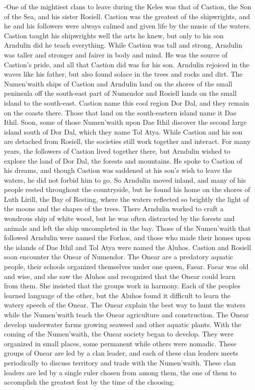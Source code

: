 \documentclass[smalldemyvopaper,11pt,twoside,onecolumn,openright,extrafontsizes]{memoir}
\begin{document}
{{-One of the mightiest clans to leave during the Keles was that of Castion, the Son of the Sea, and his sister Rosiell. Castion was the greatest of the shipwrights, and he and his followers were always calmed and given life by the music of the waters. Castion taught his shipwrights well the arts he knew, but only to his son Arndulin did he teach everything. While Castion was tall and strong, Arndulin was taller and stronger and fairer in body and mind. He was the source of Castion’s pride, and all that Castion did was for his son. Arndulin rejoiced in the waves like his father, but also found solace in the trees and rocks and dirt. The Numen’waith ships of Castion and Arndulin land on the shores of the small peninsula off the south-east part of Numendor and Rosiell lands on the small island to the south-east. Castion name this cool region Dor Dal, and they remain on the coasts there. Those that land on the south-eastern island name it Dae Ithil. Soon, some of those Numen’waith upon Dae Ithil discover the second large island south of Dor Dal, which they name Tol Atya. While Castion and his son are detached from Rosiell, the societies still work together and interact. For many years, the followers of Castion lived together there, but Arndulin wished to explore the land of Dor Dal, the forests and mountains. He spoke to Castion of his dreams, and though Castion was saddened at his son’s wish to leave the waters, he did not forbid him to go. So Arndulin moved inland, and many of his people rested throughout the countryside, but he found his home on the shores of Luth Lirill, the Bay of Resting, where the waters reflected so brightly the light of the moons and the shapes of the trees. There Arndulin worked to craft a wondrous ship of white wood, but he was often distracted by the forests and animals and left the ship uncompleted in the bay. Those of the Numen’waith that followed Arndulin were named the Forhos, and those who made their homes upon the islands of Dae Ithil and Tol Atya were named the Aluhos. Castion and Rosiell soon encounter the Onear of Numendor. The Onear are a predatory aquatic people, their schools organized themselves under one queen, Faear. Faear was old and wise, and she saw the Aluhos and recognized that the Onear could learn from them. She insisted that the groups work in harmony. Each of the peoples learned language of the other, but the Aluhos found it difficult to learn the watery speech of the Onear. The Onear explain the best way to hunt the waters while the Numen’waith teach the Onear agriculture and construction. The Onear develop underwater farms growing seaweed and other aquatic plants. With the coming of the Numen’waith, the Onear society began to develop. They were organized in small places, some permanent while others were nomadic. These groups of Onear are led by a clan leader, and each of these clan leaders meets periodically to discuss territory and trade with the Numen’waith. These clan leaders are led by a single ruler chosen from among them, the one of them to accomplish the greatest feat by the time of the choosing. 
}}
\end{document}
